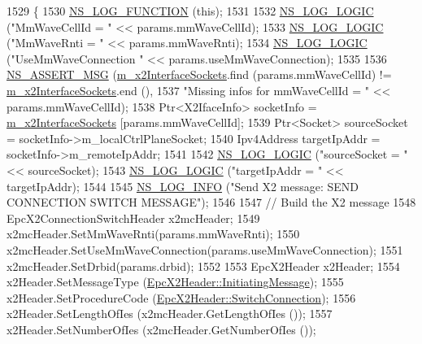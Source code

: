 \begin{DoxyCode}
1529 \{
1530   \hyperlink{log-macros-disabled_8h_a90b90d5bad1f39cb1b64923ea94c0761}{NS\_LOG\_FUNCTION} (\textcolor{keyword}{this});
1531 
1532   \hyperlink{group__logging_ga88acd260151caf2db9c0fc84997f45ce}{NS\_LOG\_LOGIC} (\textcolor{stringliteral}{"MmWaveCellId = "} << params.mmWaveCellId);
1533   \hyperlink{group__logging_ga88acd260151caf2db9c0fc84997f45ce}{NS\_LOG\_LOGIC} (\textcolor{stringliteral}{"MmWaveRnti = "} << params.mmWaveRnti);
1534   \hyperlink{group__logging_ga88acd260151caf2db9c0fc84997f45ce}{NS\_LOG\_LOGIC} (\textcolor{stringliteral}{"UseMmWaveConnection "} << params.useMmWaveConnection);
1535 
1536   \hyperlink{assert_8h_aff5ece9066c74e681e74999856f08539}{NS\_ASSERT\_MSG} (\hyperlink{classns3_1_1EpcX2_a0665276228b9b99a52ef6d5e9bdb306d}{m\_x2InterfaceSockets}.find (params.mmWaveCellId) != 
      \hyperlink{classns3_1_1EpcX2_a0665276228b9b99a52ef6d5e9bdb306d}{m\_x2InterfaceSockets}.end (),
1537                  \textcolor{stringliteral}{"Missing infos for mmWaveCellId = "} << params.mmWaveCellId);
1538   Ptr<X2IfaceInfo> socketInfo = \hyperlink{classns3_1_1EpcX2_a0665276228b9b99a52ef6d5e9bdb306d}{m\_x2InterfaceSockets} [params.mmWaveCellId];
1539   Ptr<Socket> sourceSocket = socketInfo->m\_localCtrlPlaneSocket;
1540   Ipv4Address targetIpAddr = socketInfo->m\_remoteIpAddr;
1541 
1542   \hyperlink{group__logging_ga88acd260151caf2db9c0fc84997f45ce}{NS\_LOG\_LOGIC} (\textcolor{stringliteral}{"sourceSocket = "} << sourceSocket);
1543   \hyperlink{group__logging_ga88acd260151caf2db9c0fc84997f45ce}{NS\_LOG\_LOGIC} (\textcolor{stringliteral}{"targetIpAddr = "} << targetIpAddr);
1544 
1545   \hyperlink{group__logging_gafbd73ee2cf9f26b319f49086d8e860fb}{NS\_LOG\_INFO} (\textcolor{stringliteral}{"Send X2 message: SEND CONNECTION SWITCH MESSAGE"});
1546 
1547   \textcolor{comment}{// Build the X2 message}
1548   EpcX2ConnectionSwitchHeader x2mcHeader;
1549   x2mcHeader.SetMmWaveRnti(params.mmWaveRnti);
1550   x2mcHeader.SetUseMmWaveConnection(params.useMmWaveConnection);
1551   x2mcHeader.SetDrbid(params.drbid);
1552 
1553   EpcX2Header x2Header;
1554   x2Header.SetMessageType (\hyperlink{classns3_1_1EpcX2Header_a0e69b043a20eaee4c570f223f4eca715a5761e50c3c1918a44e3a5ebc86f17435}{EpcX2Header::InitiatingMessage});
1555   x2Header.SetProcedureCode (\hyperlink{classns3_1_1EpcX2Header_afd178c1ed3c47948c587955698a15b0dabadd277dc2cdf05400c9098c496cee3d}{EpcX2Header::SwitchConnection});
1556   x2Header.SetLengthOfIes (x2mcHeader.GetLengthOfIes ());
1557   x2Header.SetNumberOfIes (x2mcHeader.GetNumberOfIes ());

\end{DoxyCode}
